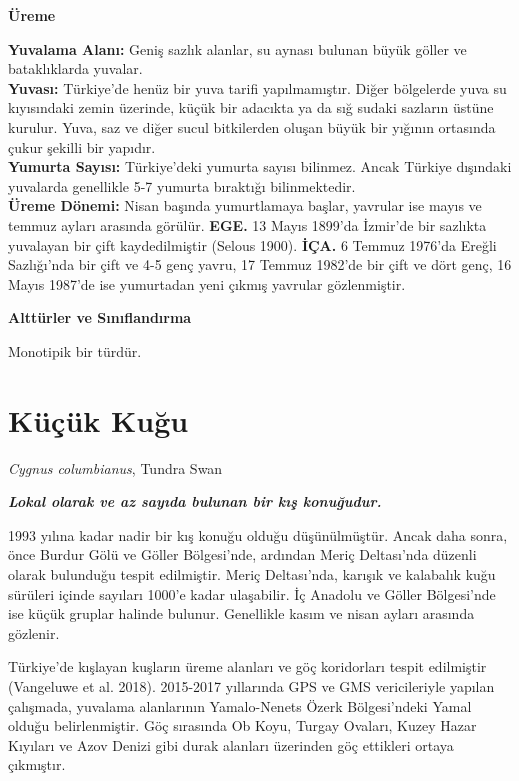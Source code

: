 \documentclass[
  letterpaper,
  DIV=11,
  numbers=noendperiod]{scrreprt}
\begin{document}
\textbf{Üreme}

\textbf{Yuvalama Alanı:} Geniş sazlık alanlar, su aynası bulunan büyük
göller ve bataklıklarda yuvalar.\\
\textbf{Yuvası:} Türkiye'de henüz bir yuva tarifi yapılmamıştır. Diğer
bölgelerde yuva su kıyısındaki zemin üzerinde, küçük bir adacıkta ya da
sığ sudaki sazların üstüne kurulur. Yuva, saz ve diğer sucul bitkilerden
oluşan büyük bir yığının ortasında çukur şekilli bir yapıdır.\\
\textbf{Yumurta Sayısı:} Türkiye'deki yumurta sayısı bilinmez. Ancak
Türkiye dışındaki yuvalarda genellikle 5-7 yumurta bıraktığı
bilinmektedir.\\
\textbf{Üreme Dönemi:} Nisan başında yumurtlamaya başlar, yavrular ise
mayıs ve temmuz ayları arasında görülür. \textbf{EGE.} 13 Mayıs 1899'da
İzmir'de bir sazlıkta yuvalayan bir çift kaydedilmiştir (Selous 1900).
\textbf{İÇA.} 6 Temmuz 1976'da Ereğli Sazlığı'nda bir çift ve 4-5 genç
yavru, 17 Temmuz 1982'de bir çift ve dört genç, 16 Mayıs 1987'de ise
yumurtadan yeni çıkmış yavrular gözlenmiştir.

\textbf{Alttürler ve Sınıflandırma}

Monotipik bir türdür.

\section{Küçük Kuğu}\label{kuxfcuxe7uxfck-kuux11fu}

\emph{Cygnus columbianus}, Tundra Swan

\textbf{\emph{Lokal olarak ve az sayıda bulunan bir kış konuğudur.}}

1993 yılına kadar nadir bir kış konuğu olduğu düşünülmüştür. Ancak daha
sonra, önce Burdur Gölü ve Göller Bölgesi'nde, ardından Meriç
Deltası'nda düzenli olarak bulunduğu tespit edilmiştir. Meriç
Deltası'nda, karışık ve kalabalık kuğu sürüleri içinde sayıları 1000'e
kadar ulaşabilir. İç Anadolu ve Göller Bölgesi'nde ise küçük gruplar
halinde bulunur. Genellikle kasım ve nisan ayları arasında gözlenir.

Türkiye'de kışlayan kuşların üreme alanları ve göç koridorları tespit
edilmiştir (Vangeluwe et al. 2018). 2015-2017 yıllarında GPS ve GMS
vericileriyle yapılan çalışmada, yuvalama alanlarının Yamalo-Nenets
Özerk Bölgesi'ndeki Yamal olduğu belirlenmiştir. Göç sırasında Ob Koyu,
Turgay Ovaları, Kuzey Hazar Kıyıları ve Azov Denizi gibi durak alanları
üzerinden göç ettikleri ortaya çıkmıştır.
\end{document}
